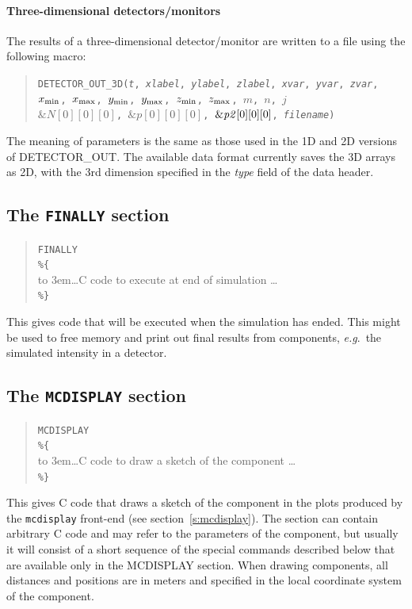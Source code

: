 \paragraph{Three-dimensional detectors/monitors}

The results of a three-dimensional detector/\discretionary{}{}{}mon\-i\-tor are written to a file using the
following macro:

\begin{quote}
  \texttt{DETECTOR\_OUT\_3D({\it t},
        {\it xlabel}, {\it ylabel}, {\it zlabel},
        {\it xvar}, {\it yvar}, {\it zvar},
        $x_{\rm min}$, $x_{\rm max}$, $y_{\rm min}$, $y_{\rm max}$,
        $z_{\rm min}$, $z_{\rm max}$, $m$, $n$, $j$\\
          $\&N[0][0][0]$, $\&p[0][0][0]$, $\&{\it p2}[0][0][0]$,
        {\it filename})}
\end{quote}
The meaning of parameters is the same as those used in the 1D and 2D
versions of DETECTOR\_OUT. The available data format currently saves
the 3D arrays as 2D, with the 3rd dimension specified in the {\it
  type} field of the data header.

\subsection{The \texttt{FINALLY} section}
\label{s:comp-finally}

\begin{quote}
  \texttt{FINALLY} \\
  \verb|%{| \\
  \hbox to 3em{}\ldots C code to execute at end of simulation \ldots \\
  \verb|%}|
\end{quote}
This gives code that will be executed when the simulation has
ended. This might be used to free memory and print out final results from components, \textit{e.g}.\ the
simulated intensity in a detector.

\subsection{The \texttt{MCDISPLAY} section}
\label{s:comp-mcdisplay}

\begin{quote}
  \texttt{MCDISPLAY} \\
  \verb|%{| \\
  \hbox to 3em{}\ldots C code to draw a sketch of the component \ldots \\
  \verb|%}|
\end{quote}
This gives C code that draws a sketch of the component in the plots
produced by the \verb+mcdisplay+ front-end (see
section~\ref{s:mcdisplay}). The section can contain arbitrary C code and
may refer to the parameters of the component, but usually it will
consist of a short sequence of the special commands described below that
are available only in the MCDISPLAY section.
When drawing components, all distances and positions are in meters and
specified in the local coordinate system of the component.

